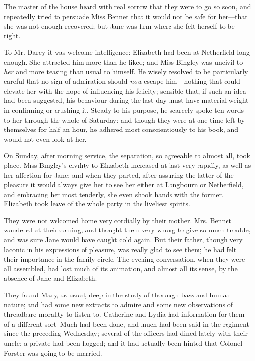 \documentclass[12pt,openright]{book}
\begin{document}
The master of the house heard with real sorrow that they were to go so soon, and repeatedly tried to persuade Miss Bennet that it would not be safe for her—that she was not enough recovered; but Jane was firm where she felt herself to be right.

To Mr. Darcy it was welcome intelligence: Elizabeth had been at Netherfield long enough. She attracted him more than he liked; and Miss Bingley was uncivil to \textit{her} and more teasing than usual to himself. He wisely resolved to be particularly careful that no sign of admiration should \textit{now} escape him—nothing that could elevate her with the hope of influencing his felicity; sensible that, if such an idea had been suggested, his behaviour during the last day must have material weight in confirming or crushing it. Steady to his purpose, he scarcely spoke ten words to her through the whole of Saturday: and though they were at one time left by themselves for half an hour, he adhered most conscientiously to his book, and would not even look at her.

On Sunday, after morning service, the separation, so agreeable to almost all, took place. Miss Bingley’s civility to Elizabeth increased at last very rapidly, as well as her affection for Jane; and when they parted, after assuring the latter of the pleasure it would always give her to see her either at Longbourn or Netherfield, and embracing her most tenderly, she even shook hands with the former. Elizabeth took leave of the whole party in the liveliest spirits.

They were not welcomed home very cordially by their mother. Mrs. Bennet wondered at their coming, and thought them very wrong to give so much trouble, and was sure Jane would have caught cold again. But their father, though very laconic in his expressions of pleasure, was really glad to see them; he had felt their importance in the family circle. The evening conversation, when they were all assembled, had lost much of its animation, and almost all its sense, by the absence of Jane and Elizabeth.

They found Mary, as usual, deep in the study of thorough bass and human nature; and had some new extracts to admire and some new observations of threadbare morality to listen to. Catherine and Lydia had information for them of a different sort. Much had been done, and much had been said in the regiment since the preceding Wednesday; several of the officers had dined lately with their uncle; a private had been flogged; and it had actually been hinted that Colonel Forster was going to be married.
\end{document}
